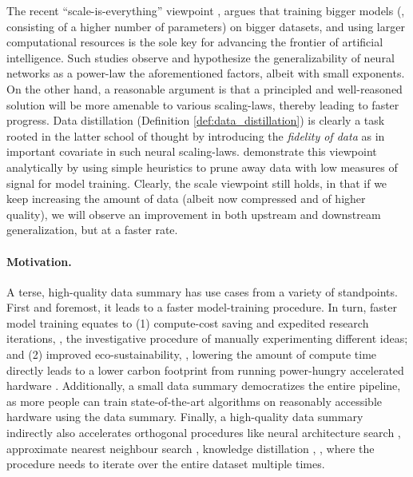 \documentclass[10pt]{article} %
\begin{document}
The recent ``scale-is-everything'' viewpoint \citep{scaling_1, scaling_2, scaling_3}, argues that training bigger models (\ie, consisting of a higher number of parameters) on bigger datasets, and using larger computational resources is the sole key for advancing the frontier of artificial intelligence. Such studies observe and hypothesize the generalizability of neural networks as a power-law \wrt the aforementioned factors, albeit with small exponents.
On the other hand, a reasonable argument is that a principled and well-reasoned solution will be more amenable to various scaling-laws, thereby leading to faster progress. 
Data distillation (Definition \ref{def:data_distillation}) is clearly a task rooted in the latter school of thought by introducing the \emph{fidelity of data} as in important covariate in such neural scaling-laws. 
\citet{data_quality} demonstrate this viewpoint analytically by using simple heuristics to
prune away data with low measures of signal for model training.
Clearly, the scale viewpoint still holds, in that if we keep increasing the amount of data (albeit now compressed and of higher quality), we will observe an improvement in both upstream and downstream generalization, but at a faster rate.

\paragraph{Motivation.} A terse, high-quality data summary has use cases from a variety of standpoints. First and foremost, it leads to a faster model-training procedure. In turn, faster model training equates to (1) compute-cost saving and expedited research iterations, \ie, the investigative procedure of manually experimenting different ideas; 
and (2) improved eco-sustainability, \ie, lowering the amount of compute time directly leads to a lower carbon footprint from running power-hungry accelerated hardware \citep{chasing_carbon}. Additionally, a small data summary democratizes the entire pipeline, as more people can train state-of-the-art algorithms on reasonably accessible hardware using the data summary. Finally, 
a high-quality data summary indirectly also accelerates orthogonal procedures like neural architecture search \citep{darts_nas}, approximate nearest neighbour search \citep{ann}, knowledge distillation \citep{knowledge_distillation}, \etc, where the procedure needs to iterate over the entire dataset multiple times.
\end{document}
